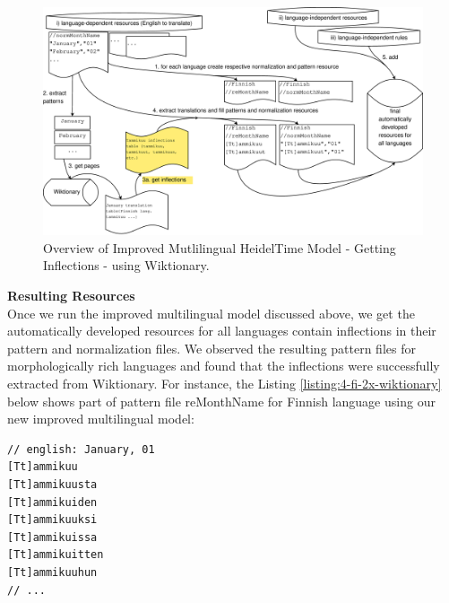 \begin{figure}[H] 
	\centering
	\includegraphics[width=14cm]{Graphics/ht-multilingual-new-1}
	\caption{Overview of Improved Mutlilingual HeidelTime Model - Getting Inflections - using Wiktionary.}
	\label{figure:4a}
\end{figure}

\textbf{Resulting Resources}\\
Once we run the improved multilingual model discussed above, we get the automatically developed resources for all languages contain inflections in their pattern and normalization files. We observed the resulting pattern files for morphologically rich languages and found that the inflections were successfully extracted from Wiktionary. For instance, the Listing \ref{listing:4-fi-2x-wiktionary} below shows part of pattern file reMonthName for Finnish language using our new improved multilingual model:\\



\begin{minipage}{\linewidth}
\begin{lstlisting}[caption={reMonthName for Finnish language - using Improved Multilingual HeidelTime Model - using Wiktionary.},label={listing:4-fi-2x-wiktionary}]
// english: January, 01
[Tt]ammikuu
[Tt]ammikuusta
[Tt]ammikuiden
[Tt]ammikuuksi
[Tt]ammikuissa
[Tt]ammikuitten
[Tt]ammikuuhun
// ...
\end{lstlisting}
\end{minipage}

